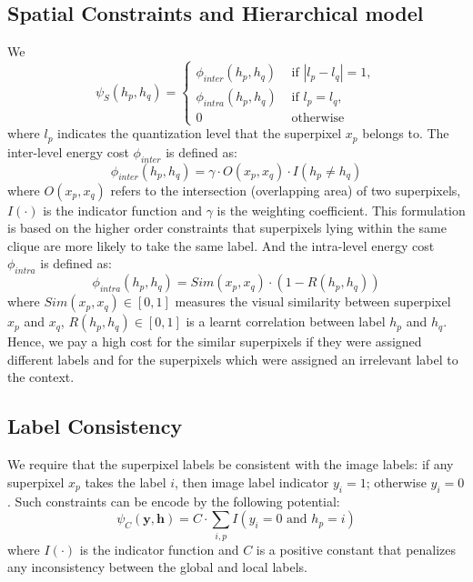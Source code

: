 \subsection{Spatial Constraints and Hierarchical model}
We
\begin{equation}
    \psi_{S}(h_p,h_q) =
    \begin{cases}
        \phi_{inter}(h_p,h_q) &\mbox{ if } | l_p - l_q | = 1,
        \\
        \phi_{intra}(h_p,h_q) &\mbox{ if } l_p = l_q,
        \\
        0 &\mbox{ otherwise }
    \end{cases}
\end{equation}
where $l_p$ indicates the quantization level that the superpixel $x_p$ belongs to.
The inter-level energy cost $\phi_{inter}$ is defined as:
\begin{equation}
    \phi_{inter}(h_p,h_q) = \gamma \cdot O(x_p,x_q) \cdot I(h_p \neq h_q)
\end{equation}
where $O(x_p,x_q)$ refers to the intersection (overlapping area) of two superpixels, $I(\cdot)$ is the indicator function and $\gamma$ is the weighting coefficient. This formulation is based on the higher order constraints \cite{kohli2009robust,ladicky2009associative} that superpixels lying within the same clique are more likely to take the same label.
And the intra-level energy cost $\phi_{intra}$ is defined as:
\begin{equation}
    \phi_{intra}(h_p,h_q) = Sim(x_p,x_q) \cdot (1-R(h_p,h_q))
\end{equation}
where $Sim(x_p,x_q) \in [0,1]$ measures the visual similarity between superpixel $x_p$ and $x_q$, $R(h_p,h_q) \in [0,1]$ is a learnt correlation between label $h_p$ and $h_q$. Hence, we pay a high cost for the similar superpixels if they were assigned different labels and for the superpixels which were assigned an irrelevant label to the context.

\subsection{Label Consistency}
We require that the superpixel labels be consistent with the image labels: if any superpixel $x_p$ takes the label $i$, then image label indicator $y_i=1$; otherwise $y_i=0$. Such constraints can be encode by the following potential:
\begin{equation}
    \psi_{C}(\boldsymbol{y},\boldsymbol{h}) =
    C \cdot \sum_{i,p} I(y_i=0 \mbox{ and } h_p=i)
\end{equation}
where $I(\cdot)$ is the indicator function and $C$ is a positive constant that penalizes any inconsistency between the global and local labels.


